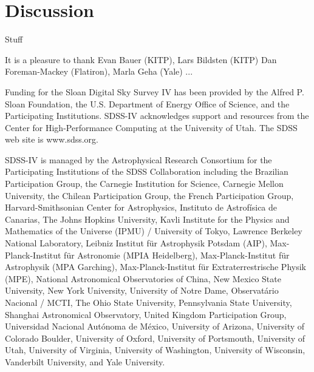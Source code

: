 \documentclass[modern]{aastex63}
\begin{document}


\section{Discussion}

Stuff


\acknowledgements

It is a pleasure to thank
Evan Bauer (KITP),
Lars Bildsten (KITP)
Dan Foreman-Mackey (Flatiron),
Marla Geha (Yale)
...

Funding for the Sloan Digital Sky Survey IV has been provided by the Alfred P.
Sloan Foundation, the U.S. Department of Energy Office of Science, and the
Participating Institutions. SDSS-IV acknowledges support and resources from the
Center for High-Performance Computing at the University of Utah. The SDSS web
site is www.sdss.org.

SDSS-IV is managed by the Astrophysical Research Consortium for the
Participating Institutions of the SDSS Collaboration including the Brazilian
Participation Group, the Carnegie Institution for Science, Carnegie Mellon
University, the Chilean Participation Group, the French Participation Group,
Harvard-Smithsonian Center for Astrophysics, Instituto de Astrof\'isica de
Canarias, The Johns Hopkins University, Kavli Institute for the Physics and
Mathematics of the Universe (IPMU) / University of Tokyo, Lawrence Berkeley
National Laboratory, Leibniz Institut f\"ur Astrophysik Potsdam (AIP),
Max-Planck-Institut f\"ur Astronomie (MPIA Heidelberg), Max-Planck-Institut
f\"ur Astrophysik (MPA Garching), Max-Planck-Institut f\"ur Extraterrestrische
Physik (MPE), National Astronomical Observatories of China, New Mexico State
University, New York University, University of Notre Dame, Observat\'ario
Nacional / MCTI, The Ohio State University, Pennsylvania State University,
Shanghai Astronomical Observatory, United Kingdom Participation Group,
Universidad Nacional Aut\'onoma de M\'exico, University of Arizona, University
of Colorado Boulder, University of Oxford, University of Portsmouth, University
of Utah, University of Virginia, University of Washington, University of
Wisconsin, Vanderbilt University, and Yale University.


\end{document}
